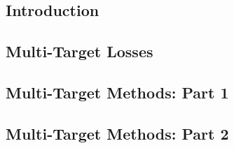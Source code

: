 

\subsection{Introduction}


\subsection{Multi-Target Losses}


\subsection{Multi-Target Methods: Part 1}


\subsection{Multi-Target Methods: Part 2}

 